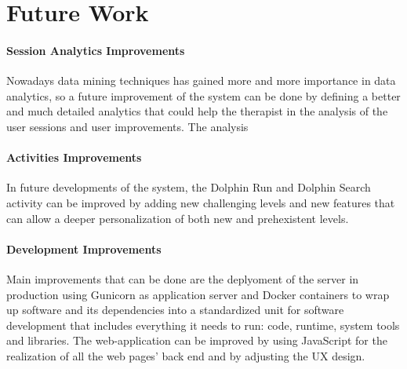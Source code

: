 	\chapter{Future Work}
	
	\subsubsection{\textbf{\Large Session Analytics Improvements}}
	Nowadays data mining techniques has gained more and more importance in data analytics, so a future improvement of the system can be done by defining a better and much detailed analytics that could help the therapist in the analysis of the user sessions and user improvements. \newline
	The analysis
	
	
	\subsubsection{\textbf{\Large Activities Improvements}}
	In future developments of the system, the Dolphin Run and Dolphin Search activity can be improved by adding new challenging levels and new features that can allow a deeper personalization of both new and prehexistent levels.
	
	\subsubsection{\textbf{\Large Development Improvements}}
	Main improvements that can be done are the deplyoment of the server in production using Gunicorn as application server and Docker containers to wrap up software and its dependencies into a standardized unit for software development that includes everything it needs to run: code, runtime, system tools and libraries. \newline
	The web-application can be improved by using JavaScript for the realization of all the web pages' back end and by adjusting the UX design.
	


	
	
	